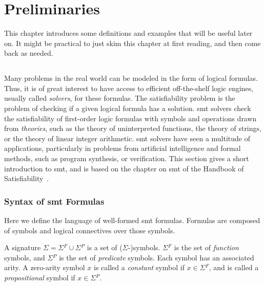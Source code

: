 \chapter{Preliminaries}
\label{chapter:preliminaries}

This chapter introduces some definitions and examples that will be useful later
on. It might be practical to just skim this chapter at first reading, and then
come back as needed.

\section{}
\label{sec:smt}

Many problems in the real world can be modeled in the form of logical formulas.
Thus, it is of great interest to have access to efficient off-the-shelf
logic engines, usually called \textit{solvers}, for these formulas.
The satisfiability problem is the problem of checking if a given logical formula
has a solution.
\gls{smt} solvers check the satisfiability of first-order logic formulas with
symbols and operations drawn from \textit{theories}, such as the theory of
uninterpreted functions, the theory of strings, or the theory of linear integer
arithmetic.
\gls{smt} solvers have seen a multitude of applications, particularly in
problems from artificial intelligence and formal methods, such as program
synthesis, or verification.
This section gives a short introduction to \gls{smt}, and is based on the
chapter on \gls{smt} of the Handbook of Satisfiability~\cite{Biere:2009:HSV}.

\subsection{Syntax of \gls{smt} Formulas}
\label{sec:smt-syntax}

Here we define the language of well-formed \gls{smt} formulas. Formulas are
composed of symbols and logical connectives over those symbols.

\begin{definition}[Signature]
  A signature $\Sigma{} = \Sigma{}^F \cup{} \Sigma{}^P$ is a set of
  ($\Sigma{}$-)symbols.
  $\Sigma{}^F$ is the set of \textit{function} symbols, and $\Sigma{}^P$ is the
  set of \textit{predicate} symbols.
  Each symbol has an associated arity. A zero-arity symbol $x$ is called a
  \textit{constant} symbol if $x \in \Sigma{}^F$, and is called a
  \textit{propositional} symbol if $x \in \Sigma{}^P$.
\end{definition}

